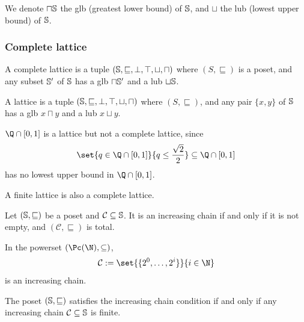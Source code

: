 \documentclass[toc, titlepaged]{../cs-classes/cs-classes}
\begin{document}
\begin{definition}[$\sqcup$, $\sqcap$]
    We denote $\sqcap\S$ the glb (greatest lower bound) of $\S$, and $\sqcup$ the lub (lowest upper bound) of $\S$.
\end{definition}

\subsubsection{Complete lattice}
\begin{definition}
    A complete lattice is a tuple $(\S,\sqsubseteq,\bot,\top, \sqcup, \sqcap)$ where $(S, \sqsubseteq)$ is a poset, and any subset $\S'$ of $\S$ has a glb $\sqcap\S'$ and a lub $\sqcup\S$.
\end{definition}

\begin{definition}[Lattice]
    A lattice is a tuple $(\S,\sqsubseteq,\bot,\top, \sqcup, \sqcap)$ where $(S, \sqsubseteq)$, and any pair $\{x, y\}$ of $\S$ has a glb $x\sqcap y$ and a lub $x\sqcup y$.
\end{definition}
\begin{example}
    $\Q\cap[0, 1]$ is a lattice but not a complete lattice, since 
    \begin{equation*}
        \set{q\in \Q\cap[0, 1]}{q\leq\frac{\sqrt{2}}{2}}\subseteq\Q\cap[0, 1]
    \end{equation*} 
    has no lowest upper bound in $\Q\cap[0, 1]$.
\end{example}
\begin{property}
    A finite lattice is also a complete lattice.
\end{property}

\begin{definition}
    Let $(\S, \sqsubseteq)$ be a poset and $\mathcal{C}\subseteq \S$. It is an increasing chain if and only if it is not empty, and $(\mathcal{C}, \sqsubseteq)$ is total.
\end{definition}

\begin{example}
    In the powerset $(\Pc(\N), \subseteq)$, 
    \begin{equation*}
        \mathcal{C}:=\set{\{2^0, \dots, 2^i\}}{i\in\N}
    \end{equation*}
    is an increasing chain.
\end{example}

\begin{definition}
    The poset $(\S, \sqsubseteq)$ satisfies the increasing chain condition if and only if any increasing chain $\mathcal{C}\subseteq \S$ is finite.
\end{definition}
\end{document}
